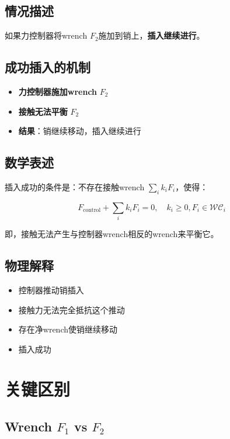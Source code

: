 \documentclass[12pt,a4paper]{article}
\begin{document}
\subsection{情况描述}

如果力控制器将wrench $F_2$施加到销上，\textbf{插入继续进行}。

\subsection{成功插入的机制}

\begin{itemize}
    \item \textbf{力控制器施加wrench} $F_2$
    \item \textbf{接触无法平衡} $F_2$
    \item \textbf{结果}：销继续移动，插入继续进行
\end{itemize}

\subsection{数学表述}

插入成功的条件是：不存在接触wrench $\sum_i k_i F_i$，使得：

\begin{equation}
F_{\text{control}} + \sum_i k_i F_i = 0, \quad k_i \geq 0, F_i \in \mathcal{WC}_i
\end{equation}

即，接触无法产生与控制器wrench相反的wrench来平衡它。

\subsection{物理解释}

\begin{itemize}
    \item 控制器推动销插入
    \item 接触力无法完全抵抗这个推动
    \item 存在净wrench使销继续移动
    \item 插入成功
\end{itemize}

\section{关键区别}

\subsection{Wrench $F_1$ vs $F_2$}
\end{document}
